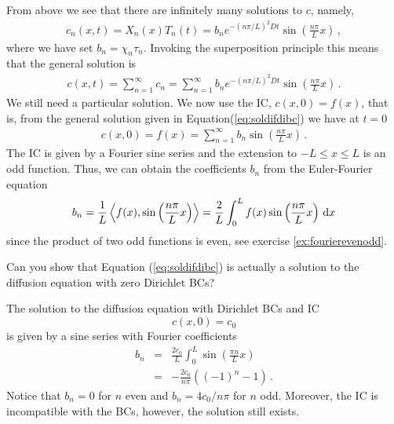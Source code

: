 From above we see that there are infinitely many solutions to $c$, namely, 
\begin{eqnarray}
	c_n(x,t) = X_n(x)T_n(t) = b_n  e^{-(n\pi/L)^2Dt}  \sin\left(\frac{n\pi}{L} x\right) \, ,
\end{eqnarray}
where we have set $b_n = \chi_n\tau_n$. Invoking the superposition principle this means that the 
general solution is
\begin{eqnarray}
	\label{eq:soldifdibc}
	c(x,t) = \sum_{n=1}^\infty c_n = \sum_{n=1}^\infty b_n  e^{-(n\pi/L)^2Dt}  \sin\left(\frac{n\pi}{L} x\right)
	\, .
\end{eqnarray}
We still need a particular solution. We now use the IC, $c(x,0)=f(x)$, that is, from the general 
solution given in Equation(\ref{eq:soldifdibc}) we have at $t=0$
\begin{eqnarray}
	\label{eq:soldiffDirichelt}
	c(x, 0) = f(x) = \sum_{n=1}^\infty b_n  \sin\left(\frac{n\pi}{L} x\right) \, .
\end{eqnarray}
The IC is given by a Fourier sine series and the extension to $-L\leq x \leq L$ is an odd function. 
Thus, we can obtain the coefficients $b_n$ from the Euler-Fourier equation
\begin{eqnarray}
	\label{eq:bnf}
	b_n = \frac{1}{L}\left\langle f(x), \sin\left(\frac{n\pi}{L} x\right) \right \rangle= 
	 \frac{2}{L} \int_{0}^L f(x) \sin\left(\frac{n\pi}{L} x\right) \, \mathrm{d} x 
\end{eqnarray}
since the product of two odd functions is even, see exercise \ref{ex:fourierevenodd}. 

\begin{question}
	Can you show that Equation (\ref{eq:soldifdibc}) is actually a solution to the diffusion equation with zero Dirichlet BCs?
\end{question}	

\begin{example}
	The solution to the diffusion equation with Dirichlet BCs and IC
	\[
		c(x,0) = c_0 
	\] 
	is given by a sine series with Fourier coefficients
	\begin{eqnarray}
		b_n &=& \frac{2c_0}{L} \int_0^L \sin\left( \frac{\pi n}{L} x \right) \nonumber \\
			&=& -\frac{2c_0}{n\pi}( (-1)^n - 1) \, .
	\end{eqnarray}
	Notice that $b_n = 0$ for $n$ even and $b_n = 4c_0/n\pi$ for $n$ odd. Moreover, the IC
	is incompatible with the BCs, however, the solution still exists. 
\end{example}	

